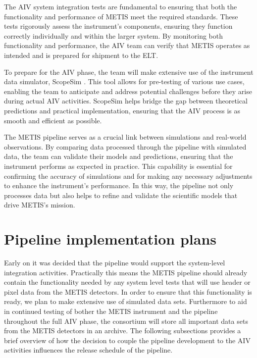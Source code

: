 \documentclass[a4paper]{spie}  %
\begin{document}
The AIV system integration tests are fundamental to ensuring that both the functionality and performance of METIS meet the required standards. These tests rigorously assess the instrument's components, ensuring they function correctly individually and within the larger system. By monitoring both functionality and performance, the AIV team can verify that METIS operates as intended and is prepared for shipment to the ELT.

To prepare for the AIV phase, the team will make extensive use of the instrument data simulator, ScopeSim \cite{scopesim}. This tool allows for pre-testing of various use cases, enabling the team to anticipate and address potential challenges before they arise during actual AIV activities. ScopeSim helps bridge the gap between theoretical predictions and practical implementation, ensuring that the AIV process is as smooth and efficient as possible.

The METIS pipeline serves as a crucial link between simulations and real-world observations. By comparing data processed through the pipeline with simulated data, the team can validate their models and predictions, ensuring that the instrument performs as expected in practice. This capability is essential for confirming the accuracy of simulations and for making any necessary adjustments to enhance the instrument's performance. In this way, the pipeline not only processes data but also helps to refine and validate the scientific models that drive METIS's mission.


\section{Pipeline implementation plans}
\label{sec:imp}

Early on it was decided that the pipeline would support the system-level integration activities.
Practically this means the METIS pipeline should already contain the functionality needed by any system level tests that will use header or pixel data from the METIS detectors.
In order to ensure that this functionality is ready, we plan to make extensive use of simulated data sets. 
Furthermore to aid in continued testing of bother the METIS instrument and the pipeline throughout the full AIV phase, the consortium will store all important data sets from the METIS detectors in an archive.
The following subsections provides a brief overview of how the decision to couple the pipeline development to the AIV activities influences the release schedule of the pipeline.
\end{document}
